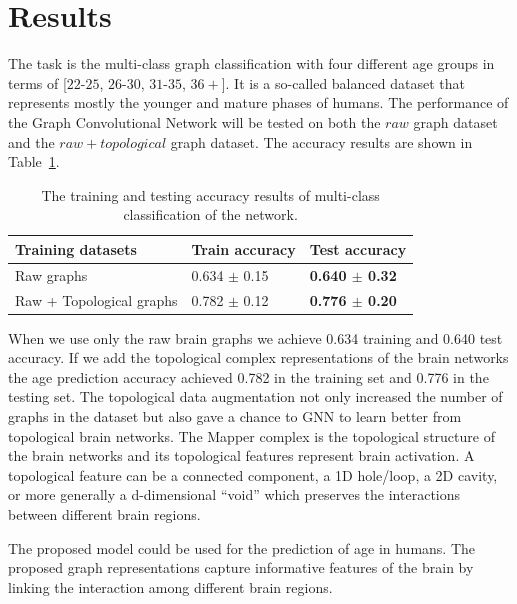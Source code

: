\documentclass[runningheads]{llncs}
\begin{document}
\section{Results}

The task is the multi-class graph classification with four different age groups in terms of [$22$-$25$, $26$-$30$, $31$-$35$, $36+$]. It is a so-called balanced dataset that represents mostly the younger and mature phases of humans. The performance of the Graph Convolutional Network will be tested on both the $raw$ graph dataset and the $raw+topological$ graph dataset. The accuracy results are shown in Table~\ref{tab:my_label}.



\begin{table}
    \centering
    \caption{The training and testing accuracy results of multi-class classification of the network.}
    \label{tab:my_label}
    \begin{tabularx}{12cm}{XXX}
    \toprule
    \textbf{Training datasets } & \textbf{Train accuracy} & \textbf{Test accuracy }\\
    \midrule
    Raw graphs & 0.634 $\pm$ 0.15  &\textbf{ 0.640 $\pm$ 0.32 }\\ 

    Raw + Topological graphs & 0.782 $\pm$ 0.12 &\textbf{ 0.776 $\pm$ 0.20 }\\ 
    \bottomrule
    \end{tabularx}
\end{table}


When we use only the raw brain graphs we achieve 0.634 training and 0.640 test accuracy. If we add the topological complex representations of the brain networks the age prediction accuracy achieved 0.782 in the training set and 0.776 in the testing set. The topological data augmentation not only increased the number of graphs in the dataset but also gave a chance to GNN to learn better from topological brain networks. The Mapper complex is the topological structure of the brain networks and its topological features represent brain activation. A topological feature can be a connected component, a 1D hole/loop, a 2D cavity, or more generally a d-dimensional “void” which preserves the interactions between different brain regions. 

The proposed model could be used for the prediction of age in humans. The proposed graph representations capture informative features of the brain by linking the interaction among different brain regions.
\end{document}
